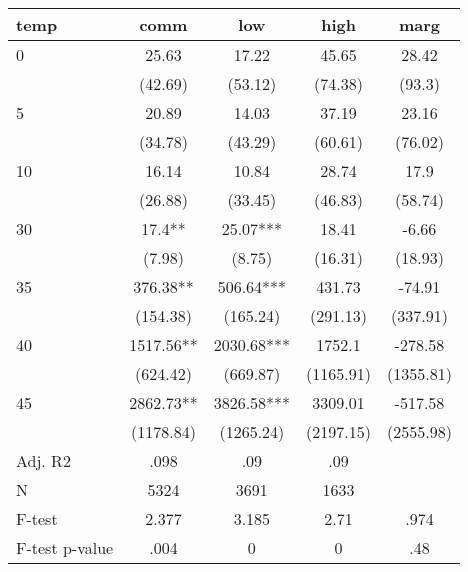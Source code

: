\documentclass[]{article}
\begin{document}
\begin{tabular}{lcccc} \hline
temp & comm & low & high & marg \\ \hline
0 & 25.63 & 17.22 & 45.65 & 28.42 \\
 & (42.69) & (53.12) & (74.38) & (93.3) \\
5 & 20.89 & 14.03 & 37.19 & 23.16 \\
 & (34.78) & (43.29) & (60.61) & (76.02) \\
10 & 16.14 & 10.84 & 28.74 & 17.9 \\
 & (26.88) & (33.45) & (46.83) & (58.74) \\
30 & 17.4** & 25.07*** & 18.41 & -6.66 \\
 & (7.98) & (8.75) & (16.31) & (18.93) \\
35 & 376.38** & 506.64*** & 431.73 & -74.91 \\
 & (154.38) & (165.24) & (291.13) & (337.91) \\
40 & 1517.56** & 2030.68*** & 1752.1 & -278.58 \\
 & (624.42) & (669.87) & (1165.91) & (1355.81) \\
45 & 2862.73** & 3826.58*** & 3309.01 & -517.58 \\
 & (1178.84) & (1265.24) & (2197.15) & (2555.98) \\
\hline Adj. R2 & .098 & .09 & .09 &  \\
N & 5324 & 3691 & 1633 &  \\
F-test & 2.377 & 3.185 & 2.71 & .974 \\
 F-test p-value & .004 & 0 & 0 & .48 \\ \hline
\end{tabular}
\end{document}
